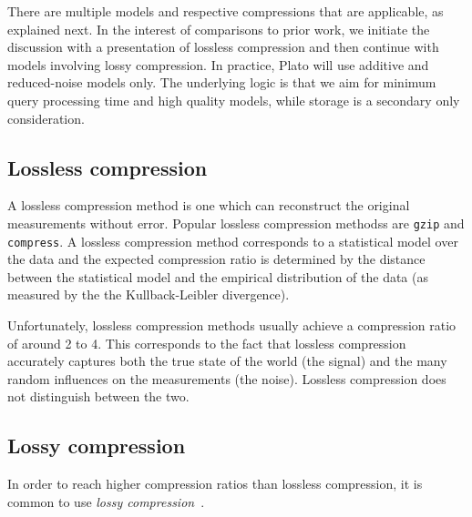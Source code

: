 There are multiple models and respective compressions that are applicable, as explained next. In the interest of comparisons to prior work, we initiate the discussion with a presentation of lossless compression and then continue with models involving lossy compression. In practice, Plato will use additive and reduced-noise models only. The underlying logic is that we aim for minimum query processing time and high quality models, while storage is a secondary only consideration.


\subsection{Lossless compression}
A lossless compression method is one which can reconstruct the
original measurements without error. Popular lossless compression
methodss are {\tt gzip} and {\tt compress}. A lossless compression
method corresponds to a statistical model over the data and the
expected compression ratio is determined by the distance between
the statistical model and the empirical distribution of the data (as
measured by the the Kullback-Leibler divergence). 

Unfortunately, lossless compression methods usually achieve a
compression ratio of around 2 to 4. This corresponds to the
fact that lossless compression accurately captures both the true state of the world (the signal)
and the many random influences on the measurements (the noise). 
Lossless compression does not distinguish between the two.

\newcommand{\vx}{\mathbf{x}}
\newcommand{\hx}{\hat{x}}
\newcommand{\vhx}{\hat{\mathbf{x}}}
\newcommand{\vc}{\mathbf{c}}
\newcommand{\vr}{\mathbf{r}}

\subsection{Lossy compression}
In order to reach higher compression ratios than lossless
compression, it is common to use {\em lossy compression}~\cite{CompressionBook}.

